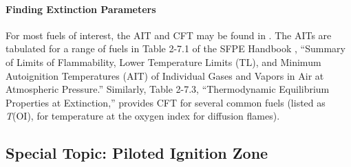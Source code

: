 \documentclass[11pt]{book}
\begin{document}
\paragraph{Finding Extinction Parameters}

For most fuels of interest, the AIT and CFT may be found in \cite{SFPE:Beyler}.  The AITs are tabulated for a range of fuels in Table 2-7.1 of the SFPE Handbook \cite{SFPE}, ``Summary of Limits of Flammability, Lower Temperature Limits (TL), and Minimum Autoignition Temperatures (AIT) of Individual Gases and Vapors in Air at Atmospheric Pressure.''  Similarly, Table 2-7.3, ``Thermodynamic Equilibrium Properties at Extinction,'' provides CFT for several common fuels (listed as {\it T}(OI), for temperature at the oxygen index for diffusion flames).


\subsection{Special Topic: Piloted Ignition Zone}

\label{info:ignition}
\end{document}
